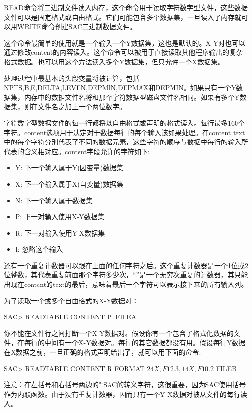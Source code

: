 READ命令将二进制文件读入内存，这个命令用于读取字符数字型文件，这些数据文件可以是固定格式或自由格式。它们可能包含多个数据集，一旦读入了内存就可以用WRITE命令创建SAC二进制数据文件。

这个命令最简单的使用就是一个输入一个Y数据集，这也是默认的。X-Y对也可以通过修改content的内容读入。这个命令可以被用于直接读取其他程序输出的复杂格式数据。也可以用这个方法读入多个Y数据集，但只允许一个X数据集。

处理过程中最基本的头段变量将被计算，包括NPTS,B,E,DELTA,LEVEN,DEPMIN,DEPMAX和DEPMIN。如果只有一个Y数据集，内存中的数据文件名将和那个字符数据型磁盘文件名相同。如果有多个Y数据集，则在文件名之加上一个两位数字。	

字符数字型数据文件的每一行都将以自由格式或声明的格式读入。每行最多160个字符。content选项用于决定对于数据每行的每个输入该如果处理。在content text中的每个字符分别代表了不同的数据元素，这些字符的顺序与数据中每行的输入所代表的含义相对应。content字段允许的字符如下:
\begin{itemize}
\item Y: 下一个输入属于Y(因变量)数据集
\item X: 下一个输入属于X(自变量)数据集
\item N: 下一个输入属于数据集
\item P: 下一对输入使用X-Y数据集
\item R: 下一对输入使用Y-X数据集
\item I: 忽略这个输入
\end{itemize}

还有一个重复计数器可以跟在上面的任何字符之后。这个重复计数器是一个1位或2位整数，其代表重复前面那个字符多少次，``.''是一个无穷次重复的计数器，其只能出现在content的text的最后，意味着最后一个字符可以表示接下来的所有输入列。

为了读取一个或多个自由格式的X-Y数据对：
\begin{SACCode}
SAC> READTABLE CONTENT P. FILEA
\end{SACCode}
你不能在文件行之间打断一个X-Y数据对。假设你有一个包含了格式化数据的文件，在每行的中间有一个X-Y数据对。每行的其它数据都没有用。假设每行Y数据在X数据之前，一旦正确的格式声明给出了，就可以用下面的命令:
\begin{SACCode}
SAC> READTABLE CONTENT R FORMAT \(24X,F12.3,14X,F10.2\) FILEB
\end{SACCode}
注意：在左括号和右括号两边的"\"是SAC的转义字符，这很重要，因为SAC使用括号作为内联函数。由于没有重复计数器，因而只有一个Y-X数据对被从文件的每行读入。

